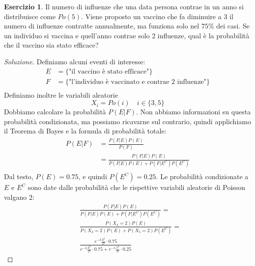 \documentclass{article}
\theoremstyle{plain}
\theoremstyle{definition}
\newtheorem{esercizio}{Esercizio}[section]
\theoremstyle{remark}
\newenvironment{soluzione}
	{\renewcommand\qedsymbol{$\mathwitch*$}\begin{proof}[Soluzione]}
	{\end{proof}}
\renewcommand{\qedsymbol}{$\mathrightghost$}
\begin{document}
\begin{esercizio}
	Il numero di influenze che una data persona contrae in un anno si distribuisce come $Po(5)$. Viene proposto un vaccino che fa diminuire a $3$ il numero di influenze contratte annualmente, ma funziona solo nel $75\%$ dei casi. Se un individuo si vaccina e quell'anno contrae solo 2 influenze, qual è la probabilità che il vaccino sia stato efficace?
	\begin{soluzione}
		Definiamo alcuni eventi di interesse:
		\begin{align*}
			E&=\{\text{"il vaccino è stato efficace"}\}\\
			F&=\{\text{"l'individuo è vaccinato e contrae 2 influenze"}\}\\
		\end{align*}
		Definiamo inoltre le variabili aleatorie
		\begin{equation*}
			X_i=Po(i)\quad i\in\{3,5\}
		\end{equation*}
		Dobbiamo calcolare la probabilità $P(E|F)$. Non abbiamo informazioni su questa probabilità condizionata, ma possiamo ricavarne sul contrario, quindi applichiamo il Teorema di Bayes e la formula di probabilità totale:
		\begin{align*}
			P(E|F)&=\frac{P(F|E)P(E)}{P(F)}\\
			&=\frac{P(F|E)P(E)}{P(F|E)P(E)+P(F|E^C)P(E^C)}\\
		\end{align*}
		Dal testo, $P(E)=0.75$, e quindi $P(E^C)=0.25$. Le probabilità condizionate a $E$ e $E^C$ sono date dalle probabilità che le rispettive variabili aleatorie di Poisson valgano 2:
		\begin{align*}
			&\frac{P(F|E)P(E)}{P(F|E)P(E)+P(F|E^C)P(E^C)}=\\
			&\frac{P(X_3=2)P(E)}{P(X_3=2)P(E)+P(X_5=2)P(E^C)}=\\
			&\frac{e^{-3}\frac{3^2}{2!}\cdot0.75}{e^{-3}\frac{3^2}{2!}\cdot0.75+e^{-5}\frac{5^2}{2!}\cdot0.25}
		\end{align*}
	\end{soluzione}
\end{esercizio}
\end{document}

